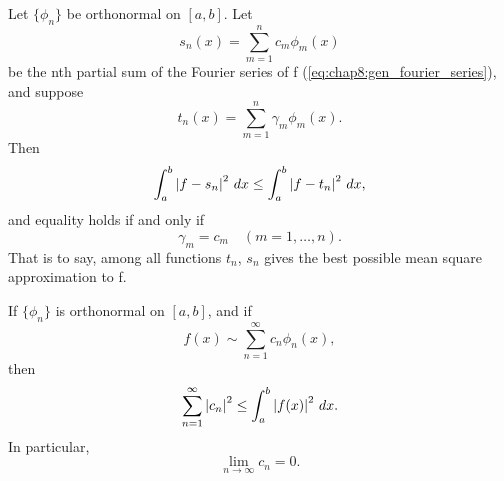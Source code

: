 


\begin{theorem} %
  \label{thm:chap8:best_mean_sq_approx}
  Let $\{\phi_n\}$ be orthonormal on $[a, b]$. Let
  \begin{equation} \label{eq:chap8:fourier_partial_sum}
    s_n(x) = \sum_{m=1}^n c_m \phi_m(x)
  \end{equation}
  be the nth partial sum of the Fourier series of f
  (\autoref{eq:chap8:gen_fourier_series}), and suppose
  \begin{equation} \label{eq:chap8:gen_trig_poly}
    t_n(x) = \sum_{m=1}^n \gamma_m \phi_m(x).
  \end{equation}
  Then
  \begin{equation} \label{eq:chap8:min_sq_error}
    \int_a^b \left\lvert f - s_n \right\rvert^2 \, dx \le \int_a^b \left\lvert f - t_n \right\rvert^2 \, dx,
  \end{equation}
  and equality holds if and only if
  \begin{equation} \label{eq:chap8:min_sq_error_cond}
    \gamma_m = c_m \quad (m=1, \dots, n).
  \end{equation}
  That is to say, among all functions $t_n$, $s_n$ gives the best
  possible mean square approximation to f.
\end{theorem}

\begin{theorem} %
  \label{thm:chap8:bessels_inequality}
  If $\{\phi_n\}$ is orthonormal on $[a, b]$, and if
  \[ f(x) \sim \sum_{n=1}^\infty c_n \phi_n(x), \]
  then
  \begin{equation} \label{eq:chap8:bessel_inequality}
    \sum_{n=1}^\infty \left\lvert c_n \right\rvert^2 \le \int_a^b \left\lvert f(x) \right\rvert^2 \, dx.
  \end{equation}
  In particular,
  \begin{equation} \label{eq:chap8:coeffs_to_zero}
    \lim_{n \to \infty} c_n = 0.
  \end{equation}
\end{theorem}

